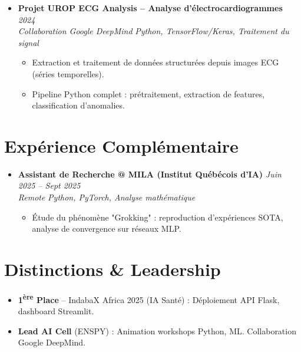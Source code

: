 \documentclass[a4paper,11pt]{article}
\begin{document}
\begin{itemize}[leftmargin=*, label={-}]
\item \textbf{Projet UROP ECG Analysis -- Analyse d'électrocardiogrammes} \hfill \textit{2024} \\
\textit{Collaboration Google DeepMind} \hfill \textit{Python, TensorFlow/Keras, Traitement du signal}
\vspace{-2pt}
    \begin{itemize}[leftmargin=0.4cm, nosep, label=\tiny$\bullet$]
        \item \small{Extraction et traitement de données structurées depuis images ECG (séries temporelles).}
        \item \small{Pipeline Python complet : prétraitement, extraction de features, classification d'anomalies.}
    \end{itemize}
\vspace{3pt}

\end{itemize}

\section{Expérience Complémentaire}
\begin{itemize}[leftmargin=*, label={-}]

\item \textbf{Assistant de Recherche @ MILA (Institut Québécois d'IA)} \hfill \textit{Juin 2025 -- Sept 2025} \\
\textit{Remote} \hfill \textit{Python, PyTorch, Analyse mathématique}
\vspace{-2pt}
    \begin{itemize}[leftmargin=0.4cm, nosep, label=\tiny$\bullet$]
        \item \small{Étude du phénomène "Grokking" : reproduction d'expériences SOTA, analyse de convergence sur réseaux MLP.}
    \end{itemize}
\vspace{3pt}

\end{itemize}

\section{Distinctions \& Leadership}
\begin{itemize}[leftmargin=*, nosep, label=\tiny$\bullet$]
    \item \small{\textbf{1\textsuperscript{ère} Place} -- IndabaX Africa 2025 (IA Santé) : Déploiement API Flask, dashboard Streamlit.}
    \item \small{\textbf{Lead AI Cell} (ENSPY) : Animation workshops Python, ML. Collaboration Google DeepMind.}
\end{itemize}
\end{document}
